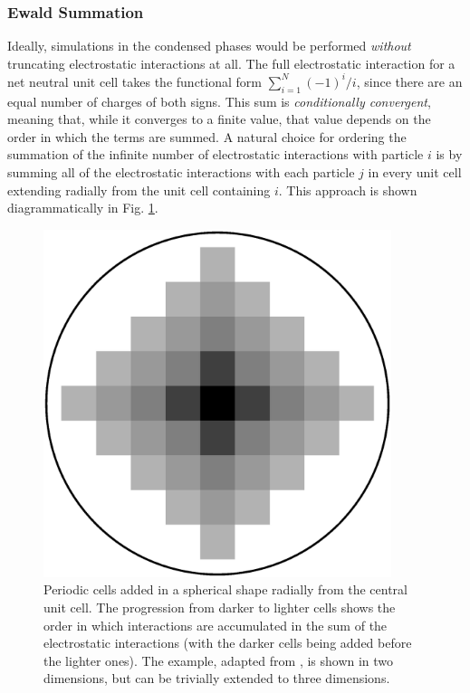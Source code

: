 \subsubsection{Ewald Summation}

Ideally, simulations in the condensed phases would be performed \emph{without}
truncating electrostatic interactions at all. The full electrostatic interaction
for a net neutral unit cell takes the functional form $\sum_{i=1}^N (-1)^i / i$,
since there are an equal number of charges of both signs. This sum is
\emph{conditionally convergent}, meaning that, while it converges to a finite
value, that value depends on the order in which the terms are summed.
\cite{Allen_Tildesley} A natural choice for ordering the summation of the
infinite number of electrostatic interactions with particle $i$ is by summing
all of the electrostatic interactions with each particle $j$ in every unit cell
extending radially from the unit cell containing $i$. This approach is shown
diagrammatically in Fig. \ref{fig2:PeriodicCells}.
\cite{Allen_Tildesley}

\begin{figure}
   \includegraphics[height=4in, angle=90, trim=0.1cm 2cm 0.1cm 2cm, clip=true]
                    {PeriodicCells.ps}
   \caption[Periodic cells added in a spherical shape radially from the central
            unit cell. The progression from darker to lighter cells shows]
           {Periodic cells added in a spherical shape radially from the central
            unit cell. The progression from darker to lighter cells shows the
            order in which interactions are accumulated in the sum of the
            electrostatic interactions (with the darker cells being added before
            the lighter ones). The example, adapted from
            \citeauthor{Allen_Tildesley}, is shown in two dimensions, but can
            be trivially extended to three dimensions. \cite{Allen_Tildesley}}
   \label{fig2:PeriodicCells}
\end{figure}

